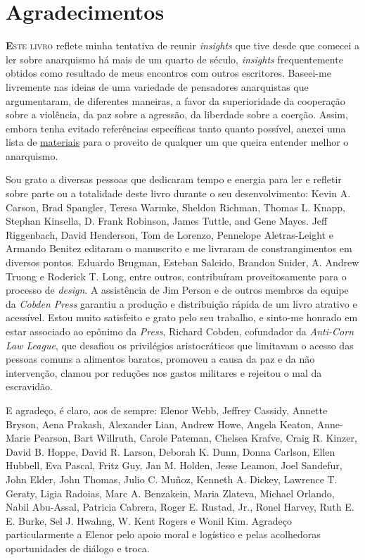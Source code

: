 
\chapter{Agradecimentos}

\lettrine[lines=2]{\textcolor{LettrineColor}{\textbf{E}}}{ste livro} reflete minha tentativa de reunir \emph{insights} que tive desde que comecei a ler sobre anarquismo há mais de um quarto de século, \emph{insights} frequentemente obtidos como resultado de meus encontros com outros escritores. Baseei-me livremente nas ideias de uma variedade de pensadores anarquistas que argumentaram, de diferentes maneiras, a favor da superioridade da cooperação sobre a violência, da paz sobre a agressão, da liberdade sobre a coerção. Assim, embora tenha evitado referências específicas tanto quanto possível, anexei uma lista de \hyperref[chap:rec]{materiais} para o proveito de qualquer um que queira entender melhor o anarquismo.

Sou grato a diversas pessoas que dedicaram tempo e energia para ler e refletir sobre parte ou a totalidade deste livro durante o seu desenvolvimento: Kevin A. Carson, Brad Spangler, Teresa Warmke, Sheldon Richman, Thomas L. Knapp, Stephan Kinsella, D. Frank Robinson, James Tuttle, and Gene Mayes. Jeff Riggenbach, David Henderson, Tom de Lorenzo, Pennelope Aletras-Leight e Armando Benitez editaram o manuscrito e me livraram de constrangimentos em diversos pontos. Eduardo Brugman, Esteban Salcido, Brandon Snider, A. Andrew Truong e Roderick T. Long, entre outros, contribuíram proveitosamente para o processo de \emph{design}. A assistência de Jim Person e de outros membros da equipe da \emph{Cobden Press} garantiu a produção e distribuição rápida de um livro atrativo e acessível. Estou muito satisfeito e grato pelo seu trabalho, e sinto-me honrado em estar associado ao epônimo da \emph{Press}, Richard Cobden, cofundador da \emph{Anti-Corn Law League}, que desafiou os privilégios aristocráticos que limitavam o acesso das pessoas comuns a alimentos baratos, promoveu a causa da paz e da não intervenção, clamou por reduções nos gastos militares e rejeitou o mal da escravidão.

E agradeço, é claro, aos de sempre: Elenor Webb, Jeffrey Cassidy, Annette Bryson, Aena Prakash, Alexander Lian, Andrew Howe, Angela Keaton, Anne-Marie Pearson, Bart Willruth, Carole Pateman, Chelsea Krafve, Craig R. Kinzer, David B. Hoppe, David R. Larson, Deborah K. Dunn, Donna Carlson, Ellen Hubbell, Eva Pascal, Fritz Guy, Jan M. Holden, Jesse Leamon, Joel Sandefur, John Elder, John Thomas, Julio C. Muñoz, Kenneth A. Dickey, Lawrence T. Geraty, Ligia Radoias, Marc A. Benzakein, Maria Zlateva, Michael Orlando, Nabil Abu-Assal, Patricia Cabrera, Roger E. Rustad, Jr., Ronel Harvey, Ruth E. E. Burke, Sel J. Hwahng, W. Kent Rogers e Wonil Kim. Agradeço particularmente a Elenor pelo apoio moral e logístico e pelas acolhedoras oportunidades de diálogo e troca.


